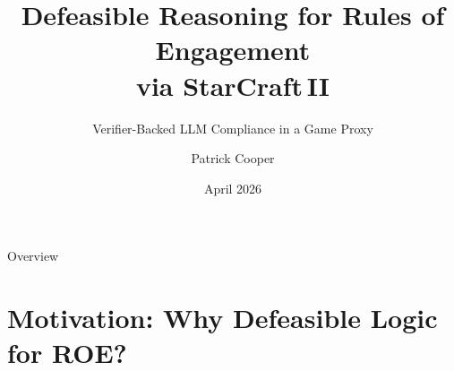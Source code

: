 \documentclass[aspectratio=169, 10pt]{beamer}
\title{Defeasible Reasoning for Rules of Engagement\\via StarCraft\,II}
\subtitle{Verifier-Backed LLM Compliance in a Game Proxy}
\author{Patrick Cooper}
\institute{Department of Computer Science \\ University of Colorado Boulder}
\date{April 2026}
\begin{document}

\maketitle

\begin{frame}{Overview}
  \tableofcontents[hideallsubsections]
\end{frame}

\section{Motivation: Why Defeasible Logic for ROE?}
\end{document}
